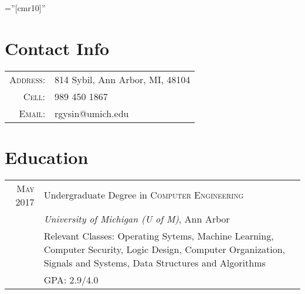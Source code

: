 \documentclass[a4paper,10pt]{article} %
\begin{document}
\pagestyle{empty} %

\font\fb=''[cmr10]'' %


\par{\bigskip\par} %

\section{Contact Info}

\begin{tabular}{rl}
\textsc{Address:} & 814 Sybil, Ann Arbor, MI, 48104 \\
\textsc{Cell:} & 989 450 1867\\
\textsc{Email:} & rgysin@umich.edu
\end{tabular}


\section{Education}

\begin{tabular}{r|p{12cm}}
\textsc{May} 2017\space\space& Undergraduate Degree in \textsc{Computer Engineering} \\
& \normalsize\emph{University of Michigan (U of M)}, Ann Arbor \\
& \footnotesize{Relevant Classes: Operating Sytems, Machine Learning,
  Computer Security, Logic Design, Computer Organization, Signals and Systems,
  Data Structures and Algorithms} \\
& \footnotesize{GPA: 2.9/4.0} \\
\end{tabular}

\end{document}
